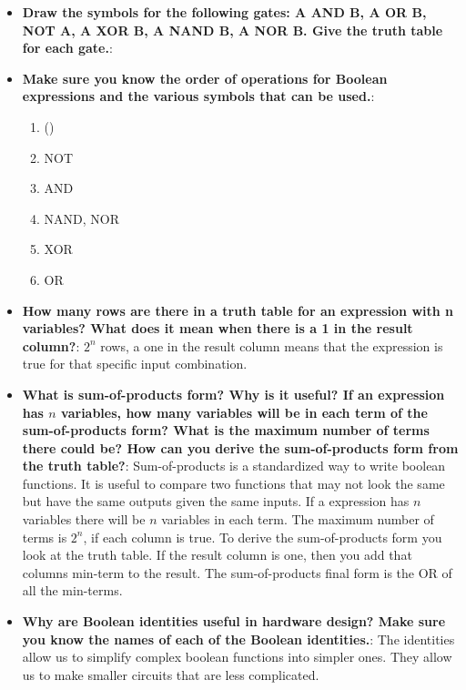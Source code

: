 \documentclass{report}
\begin{document}
    \pagebreak 
    \begin{itemize}
        \item \textbf{Draw the symbols for the following gates: A AND B, A OR B, NOT A, A XOR B, A NAND B, A NOR B. Give the truth table for each gate.}:
        \item \textbf{Make sure you know the order of operations for Boolean expressions and the various symbols that can be used.}:
            \begin{enumerate}
                \item ()
                \item NOT
                \item AND
                \item NAND, NOR
                \item XOR
                \item OR
            \end{enumerate}
        \item \textbf{How many rows are there in a truth table for an expression with n variables? What does it mean when there is a 1 in the result column?}: $2^{n}$ rows, a one in the result column means that the expression is true for that specific input combination. 
        \item \textbf{What is sum-of-products form? Why is it useful? If an expression has $n$ variables, how many variables will be in each term of the sum-of-products form? What is the maximum number of terms there could be? How can you derive the sum-of-products form from the truth table?}:
            Sum-of-products is a standardized way to write boolean functions. It is useful to compare two functions that may not look the same but have the same outputs given the same inputs.
            \bigbreak \noindent 
            If a expression has $n$ variables there will be $n$ variables in each term. The maximum number of terms is $2^{n}$, if each column is true.
            \bigbreak \noindent 
            To derive the sum-of-products form you look at the truth table. If the result column is one, then you add that columns min-term to the result. The sum-of-products final form is the OR of all the min-terms.
        \item \textbf{Why are Boolean identities useful in hardware design? Make sure you know the names of each of the Boolean identities.}:
            The identities allow us to simplify complex boolean functions into simpler ones. They allow us to make smaller circuits that are less complicated.

\end{itemize}
\end{document}
